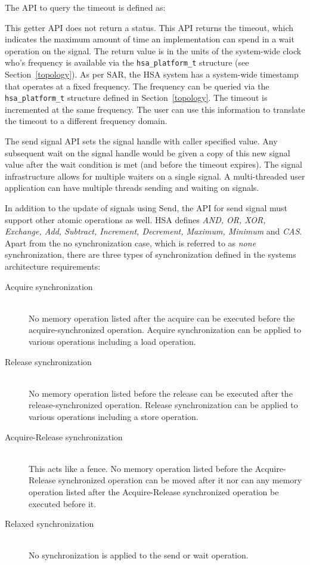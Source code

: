 \documentclass{book}
\newcommand{\diffblock}[1]{#1}
\newcommand{\dbtt}[1]{\diffblock{\texttt{#1}}}
\begin{document}
The API to query the timeout is defined as:



This getter API does not return a status.  This API returns the
timeout, which indicates the maximum amount of time an
implementation can spend in a wait operation on the signal. The
return value is in the units of
the system-wide clock who's frequency is available via the
\dbtt{hsa\_platform\_t} structure (see Section~\ref{topology}). As
per SAR, the HSA system has a system-wide timestamp that operates at
a fixed frequency. The frequency can be
queried via the \texttt{hsa\_platform\_t} structure defined in
Section~\ref{topology}. The timeout is incremented at the same
frequency.  The user can use this information to translate the
timeout to a different frequency domain.

The send signal API sets the signal handle with caller specified
value. Any subsequent wait on the signal handle would be given
a copy of this new signal value after the wait condition
is met (and before the timeout expires).  The signal infrastructure
allows for multiple waiters on a single signal. A multi-threaded
user application can have multiple threads sending and waiting on
signals.

In addition to the update of signals using
Send, the API for send signal must support other atomic operations as
well. HSA defines \emph {AND, OR, XOR, Exchange, Add, Subtract,
Increment, Decrement, Maximum, Minimum} and \emph{CAS}. Apart from
the no synchronization case, which is referred to as \emph{none}
synchronization, there are three types of synchronization defined in
the systems architecture requirements:

\begin{description}
        \item[Acquire synchronization] \hfill \\
                No memory operation listed after the acquire can be
                executed before the acquire-synchronized operation. Acquire
                synchronization can be applied to various operations
                including a load operation.
        \item[Release synchronization] \hfill \\
                No memory operation listed before the release can be
                executed after the release-synchronized operation. Release
                synchronization can be applied to various operations
                including a store operation.
        \item[Acquire-Release synchronization] \hfill \\
                This acts like a fence. No memory operation listed
                before the Acquire-Release synchronized operation
                can be moved after it nor can any memory operation
                listed after the Acquire-Release synchronized
                operation be executed before it.
        \item[Relaxed synchronization] \hfill \\
                No synchronization is applied to the send or wait
                operation.
\end{description}
\end{document}
